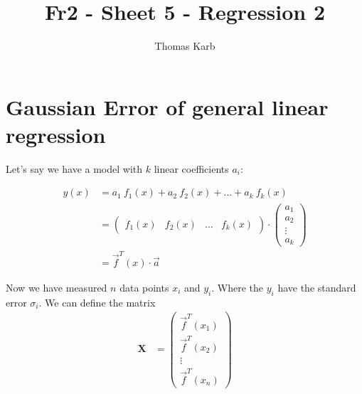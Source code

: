 \documentclass[11pt]{article}
\begin{document}
    
    \author{Thomas Karb}
    \title{Fr2 - Sheet 5 - Regression 2}
    
    \maketitle

    \section{Gaussian Error of general linear regression}
    
    Let's say we have a model with $k$ linear coefficients $a_i$:
    
    \newcommand{\funcTrans}{\vec{f}^{T}}
    \newcommand{\aVec}{\vec{a}}
    \begin{align*}
        y(x) &= a_1 \ f_1(x) + a_2 \ f_2(x) + \dots + a_k \ f_k(x) \\
        &= \begin{pmatrix}
               f_1(x) & f_2(x) & \dots & f_k(x)
        \end{pmatrix} \cdot \begin{pmatrix}
                            a_1 \\
                            a_2 \\
                            \vdots \\
                            a_k
        \end{pmatrix} \\
        &= \funcTrans(x) \cdot \aVec
    \end{align*}
    
    Now we have measured $n$ data points $x_i$ and $y_i$.
    Where the $y_i$ have the standard error $\sigma_i$.
    We can define the matrix
    \newcommand{\yVec}{\vec{y}}
    \newcommand{\xMatrix}{\boldsymbol{X}}
    \newcommand{\xMatrixT}{\boldsymbol{X}^T}
    \begin{align*}
        \xMatrix &= \begin{pmatrix}
                        \funcTrans(x_1) \\
                        \funcTrans(x_2) \\
                        \vdots \\
                        \funcTrans(x_n)
        \end{pmatrix}
    \end{align*}
    
\end{document}
